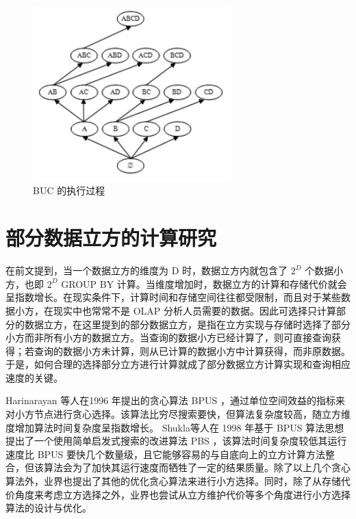 \begin{itemize}
\begin{figure}[!htb]
\centering\includegraphics[width=3in]{picture/ch_current_research/BUC_execution} 
\caption{BUC 的执行过程}\label{BUC_execution} 
\end{figure} 

\end{itemize}

\section{部分数据立方的计算研究}

在前文提到，当一个数据立方的维度为 D 时，数据立方内就包含了 ${2}^{D}$ 个数据小方，也即 ${2}^{D}$ GROUP BY 计算。当维度增加时，数据立方的计算和存储代价就会呈指数增长。在现实条件下，计算时间和存储空间往往都受限制，而且对于某些数据小方，在现实中也常常不是 OLAP 分析人员需要的数据。因此可选择只计算部分的数据立方，在这里提到的部分数据立方，是指在立方实现与存储时选择了部分小方而非所有小方的数据立方。当查询的数据小方已经计算了，则可直接查询获得；若查询的数据小方未计算，则从已计算的数据小方中计算获得，而非原数据。于是，如何合理的选择部分立方进行计算就成了部分数据立方计算实现和查询相应速度的关键。

Harinarayan 等人在1996 年提出的贪心算法 BPUS \cite{harinarayan1996implementing} ，通过单位空间效益的指标来对小方节点进行贪心选择。该算法比穷尽搜索要快，但算法复杂度较高，随立方维度增加算法时间复杂度呈指数增长。 Shukla等人在 1998 年基于 BPUS 算法思想提出了一个使用简单启发式搜索的改进算法 PBS \cite{shukla1998materialized} ，该算法时间复杂度较低其运行速度比 BPUS 要快几个数量级，且它能够容易的与自底向上的立方计算方法整合，但该算法会为了加快其运行速度而牺牲了一定的结果质量。除了以上几个贪心算法外，业界也提出了其他的优化贪心算法来进行小方选择。同时，除了从存储代价角度来考虑立方选择之外，业界也尝试从立方维护代价等多个角度进行小方选择算法的设计与优化。

